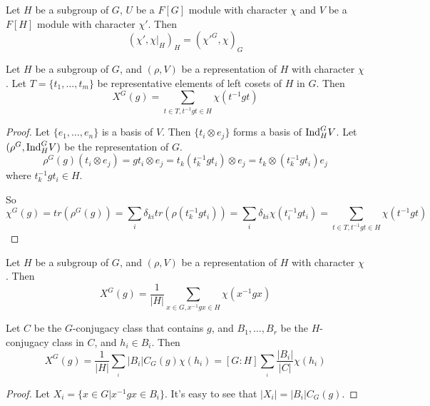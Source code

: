 \documentclass[12pt]{book}
\begin{document}
	\begin{corollary}
		Let $H$ be a subgroup of $G$, $U$ be a $F[G]$ module with character $\chi$ and $V$ be a $F[H]$ module with character $\chi'$. Then 
		\begin{equation}
			(\chi',\chi|_H)_H=(\chi'^G,\chi)_G
		\end{equation}
	\end{corollary}
	
	\begin{theorem}
		Let $H$ be a subgroup of $G$, and $(\rho,V)$ be a representation of $H$ with character $\chi$. Let $T=\{t_1,\dots,t_m\}$ be representative elements of left cosets of $H$ in $G$. Then
		\begin{equation}
			X^G(g)=\sum_{t\in T,t^{-1}gt\in H}\chi(t^{-1}gt)
		\end{equation}
	\end{theorem}
	
	\begin{proof}
		Let $\{e_1,\dots,e_n\}$ is a basis of $V$. Then $\{t_i\otimes e_j\}$ forms a basis of ${\rm Ind} ^G_H V$. Let $(\rho^G,{\rm Ind} ^G_H V)$ be the representation of $G$.
		\begin{equation}
			\rho^G(g)(t_i\otimes e_j)=gt_i\otimes e_j= t_k(t_k^{-1}gt_i)\otimes e_j= t_k\otimes (t_k^{-1}gt_i)e_j
		\end{equation}
		where $t_k^{-1}gt_i\in H$.
		
		So
		\begin{equation}
			\chi^G(g)=tr(\rho^G(g))=\sum_i\delta_{ki}tr(\rho(t_k^{-1}gt_i))=\sum_i\delta_{ki}\chi(t_i^{-1}gt_i)= \sum_{t\in T,t^{-1}gt\in H}\chi(t^{-1}gt)
		\end{equation}
	\end{proof}
	
	\begin{corollary}
		Let $H$ be a subgroup of $G$, and $(\rho,V)$ be a representation of $H$ with character $\chi$. Then
		\begin{equation}
			X^G(g)=\frac 1{|H|}\sum_{x\in G,x^{-1}gx\in H}\chi(x^{-1}gx)
		\end{equation}
		
		Let $C$ be the $G$-conjugacy class that contains $g$, and $B_1,\dots,B_r$ be the $H$-conjugacy class in $C$, and $h_i\in B_i$. Then
		\begin{equation}
			X^G(g)=\frac 1{|H|}\sum_{_i}|B_i|C_G(g)\chi(h_i)=[G:H]\sum_{_i}\frac{|B_i|}{|C|}\chi(h_i)
		\end{equation}
	\end{corollary}
	\begin{proof}
		Let $X_i=\{x\in G| x^{-1}gx\in B_i\}$. It's easy to see that $|X_i|=|B_i|C_G(g)$.
	\end{proof}
	
\end{document}

